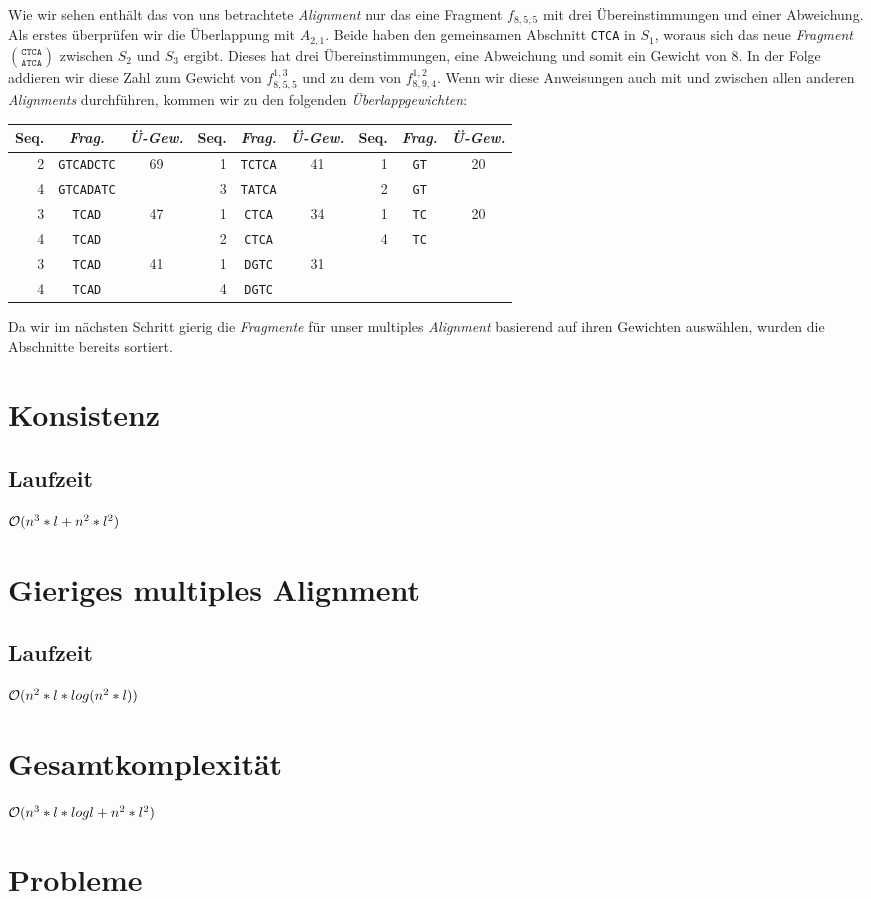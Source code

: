 Wie wir sehen enthält das von uns betrachtete \emph{Alignment} nur das eine Fragment $f_{8,5,5}$ mit drei Übereinstimmungen und einer Abweichung. Als erstes überprüfen wir die Überlappung mit $A_{2,1}$. Beide haben den gemeinsamen Abschnitt \texttt{CTCA} in $S_1$, woraus sich das neue \emph{Fragment} ${\texttt{CTCA}}\choose{\texttt{ATCA}}$ zwischen $S_2$ und $S_3$ ergibt. Dieses hat drei Übereinstimmungen, eine Abweichung und somit ein Gewicht von 8. In der Folge addieren wir diese Zahl zum Gewicht von $f_{8,5,5}^{1,3}$ und zu dem von $f_{8,9,4}^{1,2}$. Wenn wir diese Anweisungen auch mit und zwischen allen anderen \emph{Alignments} durchführen, kommen wir zu den folgenden \emph{Überlappgewichten}:

\begin{tabular}{r|c|c||r|c|c||r|c|c}
	Seq. & \emph{Frag.} & \emph{Ü-Gew.} & Seq. & \emph{Frag.} & \emph{Ü-Gew.} & Seq. & \emph{Frag.} & \emph{Ü-Gew.}\\
	\hline
	2 & \texttt{GTCADCTC} & \multirow{2}{*}{69} & 1 & \texttt{TCTCA} & \multirow{2}{*}{41} & 1 & \texttt{GT} &\multirow{2}{*}{20} \\
	4 & \texttt{GTCADATC} &                     & 3 & \texttt{TATCA} &                     & 2 & \texttt{GT} & \\
	3 & \texttt{TCAD} & \multirow{2}{*}{47} & 1 & \texttt{CTCA} & \multirow{2}{*}{34} & 1 & \texttt{TC} & \multirow{2}{*}{20} \\
	4 & \texttt{TCAD} &                     & 2 & \texttt{CTCA} &                          & 4 & \texttt{TC} & \\
	3 & \texttt{TCAD} & \multirow{2}{*}{41} & 1 & \texttt{DGTC} & \multirow{2}{*}{31} &    &   & \\
    4 & \texttt{TCAD} &                     & 4 & \texttt{DGTC} &                     &    &   & \\

\end{tabular}

Da wir im nächsten Schritt gierig die \emph{Fragmente} für unser multiples \emph{Alignment} basierend auf ihren Gewichten auswählen, wurden die Abschnitte bereits sortiert.

\section{Konsistenz}

\subsection{Laufzeit}
$\mathcal{O}(n^3*l + n^2*l^2)$

\section{Gieriges multiples Alignment}

\subsection{Laufzeit}
$\mathcal{O}(n^2*l*log(n^2*l))$

\section{Gesamtkomplexität}
$\mathcal{O}(n^3*l*log l + n^2*l^2)$

\section{Probleme}
